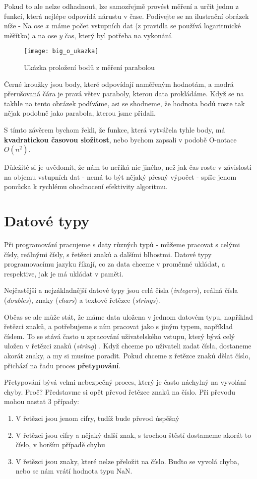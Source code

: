 Pokud to ale nelze odhadnout, lze samozřejmě provést měření a určit jednu z funkcí, která nejlépe odpovídá nárustu v čase. Podívejte se na ilustrační obrázek níže - Na ose $x$ máme počet vstupních dat (z pravidla se používá logaritmické měřítko) a na ose $y$ čas, který byl potřeba na vykonání.

\begin{figure}[H]
	\texttt{[image: big\_o\_ukazka]}
	\centering
	\caption{Ukázka proložení bodů z měření parabolou}
\end{figure}

Černé kroužky jsou body, které odpovídají naměřeným hodnotám, a modrá přerušovaná čára je pravá větev paraboly, kterou data prokládáme. Když se na takhle na tento obrázek podíváme, asi se shodneme, že hodnota bodů roste tak nějak podobně jako parabola, kterou jsme přidali.

S tímto závěrem bychom řekli, že funkce, která vytvářela tyhle body, má \textbf{kvadratickou časovou složitost}, nebo bychom zapsali v podobě O-notace $O(n^2)$.

Důležité si je uvědomit, že nám to neříká nic jiného, než jak čas roste v závislosti na objemu vstupních dat - nemá to být nějaký přesný výpočet - spíše jenom pomůcka k rychlému ohodnocení efektivity algoritmu.

\section{Datové typy}
Při programování pracujeme s daty různých typů - můžeme pracovat s celými čísly, reálnými čísly, s řetězci znaků a dalšími blbostmi. Datové typy programovacímu jazyku říkají, co za data chceme v proměnné ukládat, a respektive, jak je má ukládat v paměti.

Nejčastější a nejzákladnější datové typy jsou celá čísla (\textit{integers}), reálná čísla (\textit{doubles}), znaky (\textit{chars}) a textové řetězce (\textit{strings}).

Občas se ale může stát, že máme data uložena v jednom datovém typu, například řetězci znaků, a potřebujeme s ním pracovat jako s jiným typem, například číslem. To se stává často u zpracování uživatelského vstupu, který bývá celý uložen v řetězci znaků (\textit{string}) \cite{kralovcova}. Když chceme po uživateli zadat čísla, dostaneme akorát znaky, a my si musíme poradit. Pokud chceme z řetězce znaků dělat číslo, přichází na řadu proces \textbf{přetypování}.

Přetypování bývá velmi nebezpečný proces, který je často náchylný na vyvolání chyby. Proč? Představme si opět převod řetězce znaků na číslo. Při převodu mohou nastat 3 případy:
\begin{enumerate}
	\item V řetězci jsou jenom cifry, tudíž bude převod úspěšný
	\item V řetězci jsou cifry a nějaký další znak, s trochou štěstí dostameme akorát to číslo, v horším případě chybu
	\item V řetězci jsou znaky, které nelze přeložit na číslo. Buďto se vyvolá chyba, nebo se nám vrátí hodnota typu NaN.
\end{enumerate}

